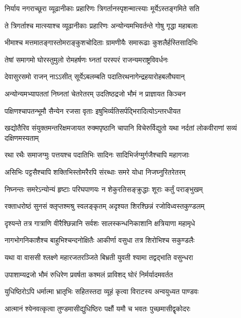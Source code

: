 \twolineshloka
{निर्याय नगराच्छूरा व्यूढानीकाः प्रहारिणः}
{त्रिगर्तानस्पृशन्मात्स्याः मूर्येऽस्तङ्गमिते सति}


\twolineshloka
{ते त्रिगर्ताश्च मात्स्याश्च व्यूढानीकाः प्रहारिणः}
{अन्योन्यमभिवर्तन्ते गोषु गृद्धा महाबलाः}


\twolineshloka
{भीमाश्च मत्तमातङ्गास्तोमराङ्कुशचोदिताः}
{ग्रामणीयैः समारूढाः कुशलैर्हस्तिसादिभिः}


\twolineshloka
{तेषां समागमो घोरस्तुमुलो रोमहर्षणः}
{घ्नतां परस्परं राजन्यमराष्ट्रविवर्धनः}


\twolineshloka
{देवासुरसमो राजन् नाऽऽसीत् सूर्येऽबलम्बति}
{पदातिरथनागेन्द्रहयारोहबलौघवान्}


\twolineshloka
{अन्योन्यमभ्यापततां निघ्नतां चेतरेतरम्}
{उदतिष्ठद्रजो भौमं न प्राज्ञायत किञ्चन}


\twolineshloka
{पक्षिणश्चापतन्भूमौ सैन्येन रजसा वृताः}
{इषुभिर्व्यतिसर्पद्भिरादित्योऽन्तरधीयत}


\onelineshloka
{खद्योतैरिव संयुक्तमन्तरिक्षमजायत}
\twolineshloka
{रुक्मपृष्ठानि चापानि विचेरुर्विद्युतो यथा}
{नर्दतां लोकवीराणां सव्यं दक्षिणमस्यताम्}


\twolineshloka
{रथा रथैः समाजग्मुः पत्तयश्च पदातिभिः}
{सादिनः सादिभिर्जग्मुर्गजैश्चापि महागजाः}


\twolineshloka
{असिभिः पट्टसैश्चापि शक्तिभिस्तोमरैरपि}
{संरब्धाः समरे योधा निजघ्नुरितरेतरम्}


\twolineshloka
{निघ्नन्तः समरेऽन्योन्यं हृष्टाः परिघपाणयः}
{न शेकुरतिसङ्क्रुद्धाः शूराः कर्तुं पराङ्भुखम्}


\twolineshloka
{रक्ताधरोष्ठं सुनसं क्लृप्तश्मश्रु स्वलङ्कृतम्}
{अदृश्यत शिरश्छिन्नं रजोविध्वस्तकुण्डलम्}


\twolineshloka
{दृश्यन्ते तत्र गात्राणि वीरैश्छिन्नानि सर्वशः}
{सालस्कन्धनिकाशानि क्षत्रियाणा महामृधे}


\twolineshloka
{नागभोगनिकाशैश्च बाहुभिश्चन्दनोक्षितैः}
{आकीर्णा वसुधा तत्र शिरोभिश्च सकुण्डलैः}


\twolineshloka
{यथा वा वाससी श्लक्ष्णे महारजतरञ्जिते}
{बिभ्रती युवती श्यामा तद्वद्भाति वसुन्धरा}


\twolineshloka
{उपाशाम्यद्रजो भौमं रुधिरेण प्रवर्षता}
{कश्मलं प्राविशद् घोरं निर्मर्यादमवर्तत}


\twolineshloka
{युधिष्ठिरोऽपि धर्मात्मा भ्रातृभिः सहितस्तदा}
{व्यूहं कृत्वा विराटस्य अन्वयुध्यत पाण्डवः}


\twolineshloka
{आत्मानं श्येनवत्कृत्वा तुण्डमासीद्युधिष्ठिरः}
{पक्षौं यमौ च भवतः पुच्छमासीद्वृकोदरः}


